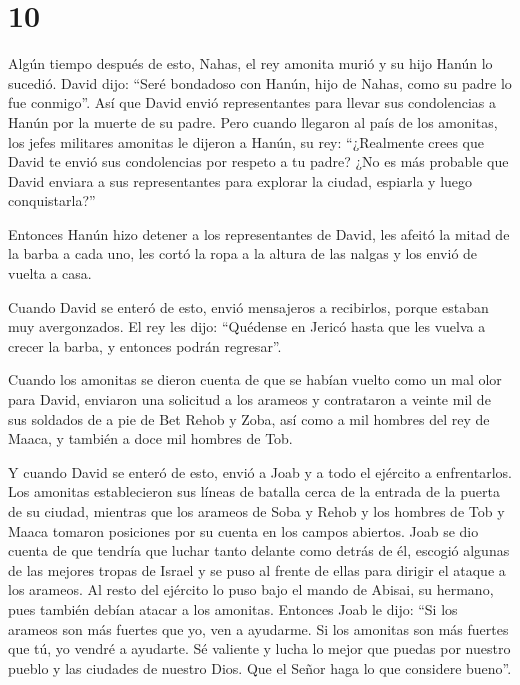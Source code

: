 \hypertarget{section-9}{%
\section{10}\label{section-9}}

 Algún tiempo después de esto, Nahas, el rey amonita murió y
su hijo Hanún lo sucedió.  David dijo: ``Seré bondadoso con
Hanún, hijo de Nahas, como su padre lo fue conmigo''. Así que David
envió representantes para llevar sus condolencias a Hanún por la muerte
de su padre. Pero cuando llegaron al país de los amonitas, 
los jefes militares amonitas le dijeron a Hanún, su rey: ``¿Realmente
crees que David te envió sus condolencias por respeto a tu padre? ¿No es
más probable que David enviara a sus representantes para explorar la
ciudad, espiarla y luego conquistarla?''

 Entonces Hanún hizo detener a los representantes de David,
les afeitó la mitad de la barba a cada uno, les cortó la ropa a la
altura de las nalgas y los envió de vuelta a casa.

 Cuando David se enteró de esto, envió mensajeros a
recibirlos, porque estaban muy avergonzados. El rey les dijo: ``Quédense
en Jericó hasta que les vuelva a crecer la barba, y entonces podrán
regresar''.

 Cuando los amonitas se dieron cuenta de que se habían
vuelto como un mal olor para David, enviaron una solicitud a los arameos
y contrataron a veinte mil de sus soldados de a pie de Bet Rehob y Zoba,
así como a mil hombres del rey de Maaca, y también a doce mil hombres de
Tob.

 Y cuando David se enteró de esto, envió a Joab y a todo el
ejército a enfrentarlos.  Los amonitas establecieron sus
líneas de batalla cerca de la entrada de la puerta de su ciudad,
mientras que los arameos de Soba y Rehob y los hombres de Tob y Maaca
tomaron posiciones por su cuenta en los campos abiertos. 
Joab se dio cuenta de que tendría que luchar tanto delante como detrás
de él, escogió algunas de las mejores tropas de Israel y se puso al
frente de ellas para dirigir el ataque a los arameos.  Al
resto del ejército lo puso bajo el mando de Abisai, su hermano, pues
también debían atacar a los amonitas.  Entonces Joab le
dijo: ``Si los arameos son más fuertes que yo, ven a ayudarme. Si los
amonitas son más fuertes que tú, yo vendré a ayudarte.  Sé
valiente y lucha lo mejor que puedas por nuestro pueblo y las ciudades
de nuestro Dios. Que el Señor haga lo que considere bueno''.

